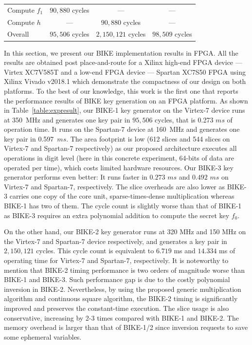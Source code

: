 \documentclass[preprint]{iacrtrans}
\begin{document}
\begin{table}[!t]
\begin{minipage}{\textwidth}
\begin{tabular}{lcccccc}
   Compute $f_1$ & \multicolumn{2}{c}{$90,880$ cycles}  & \multicolumn{2}{c}{---} &\multicolumn{2}{c}{---}\\
   Compute $h$  &  \multicolumn{2}{c}{---}          & \multicolumn{2}{c}{$90,880$ cycles} & \multicolumn{2}{c}{---}\\
   \hline
   Overall & \multicolumn{2}{c}{$95,506$ cycles} & \multicolumn{2}{c}{$2,150,121$ cycles} & \multicolumn{2}{c}{$98,509$ cycles}\\
   \hline
  \end{tabular}
  \end{minipage}
\end{table}



In this section, we present our BIKE implementation results in FPGA. All the results are obtained post place-and-route for a  Xilinx high-end FPGA device --- Virtex XC7V585T  and a low-end FPGA device ---  Spartan XC7S50 FPGA using Xilinx Vivado v2018.1 which demonstrate the compactness of our design on both platforms. To the best of our knowledge, this work is the first one that reports the performance results of BIKE key generation on an FPGA platform. As shown in Table~\ref{table:expresult}, our BIKE-1 key generator on the Virtex-7 device runs at 350~MHz and generates one key pair  in $95,506$ cycles, that is 0.273 $ms$ of operation time. It runs on the Spartan-7 device at 160~MHz and generates one key pair in 0.597~$ms$. The area footprint is low (612 slices and 544 slices on Virtex-7 and Spartan-7 respectively) as our proposed architecture executes all operations  in digit level (here in this concrete experiment, 64-bits of data are operated per time), which costs limited hardware resources. Our BIKE-3 key generator performs even better: It runs faster in $0.273$ $ms$ and $0.492$ $ms$ on Virtex-7 and Spartan-7, respectively. The slice overheads are also lower as BIKE-3 carries one copy of the core unit, sparse-times-dense multiplication whereas BIKE-1 has two of them. The cycle count is slightly worse than that of BIKE-1 as BIKE-3 requires an extra polynomial addition to compute the secret key $f_0$.

On the other hand, our BIKE-2 key generator runs at 320 MHz and 150 MHz on the Virtex-7 and Spartan-7 device respectively, and generates a key pair in $2,150,121$ cycles. This cycle count is equivalent to $6.719$ ms and $14.334$ ms of operating time for Virtex-7 and Spartan-7, respectively. It is noteworthy to mention that BIKE-2 timing performance is  two orders of magnitude worse than BIKE-1 and BIKE-3.  Such performance gap is due to the costly polynomial inversion in BIKE-2. Nevertheless, by using the proposed generic multiplication algorithm and continuous square algorithm, the BIKE-2 timing is significantly improved and preserves the constant-time execution. The slice usage is also conservative, increasing by 2-3 times compared with BIKE-1 and BIKE-2.  The memory overhead is larger than that of BIKE-1/2 since inversion requests to save some ephemeral variables.
\end{document}
